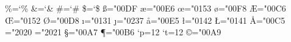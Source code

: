 \outer{}
\outer{}

\def\raggedright{\rightskip\z@ plus2em \spaceskip.3333em \xspaceskip.5em\relax}
\def\ttraggedright{\tt\rightskip\z@ plus2em\relax} %

\chardef\%=`\%
\chardef\&=`\&
\chardef\#=`\#
\chardef\$=`\$
\chardef\ss="00DF
\chardef\ae="00E6
\chardef\oe="0153
\chardef\o="00F8
\chardef\AE="00C6
\chardef\OE="0152
\chardef\O="00D8
\chardef\i="0131 \chardef\j="0237 %
\chardef\aa="00E5
\chardef\l="0142
\chardef\L="0141
\def\leavevmode{\unhbox\voidb@x} %
\def\_{\leavevmode\char"005F\relax} %
\chardef\AA="00C5
\chardef\dag="2020
\chardef\ddag="2021
\chardef\S="00A7
\chardef\P="00B6
\let\Orb=\mdlgwhtcircle
\def\oalign#1{\leavevmode\vtop{\baselineskip\z@skip \lineskip.25ex%
  \ialign{##\crcr#1\crcr}}} \def\o@lign{\lineskiplimit\z@ \oalign}
\def\ooalign{\lineskiplimit-\maxdimen \oalign} %
{\catcode`p=12 \catcode`t=12 \gdef\\#1pt{#1}} \let\getf@ctor=\\
\def\sh@ft#1{\dimen@#1\kern\expandafter\getf@ctor\the\fontdimen1\font
  \dimen@} %
\def\d#1{\smartaccent{#1}{"0323}{"02D3}} %
\def\b#1{\smartaccent{#1}{"0331}{"005F}} %
\def\c#1{\smartaccent{#1}{"0327}{"00B8}} %
\chardef\copyright="00A9
\def\dots{\relax\ifmmode\ldots\else\char"2026\relax\fi}
\def\TeX{T\kern-.1667em\lower.5ex\hbox{E}\kern-.125emX}

\def\smartaccent#1#2#3{%
  \def\temp{#1}%
  \ifx\temp\empty
    \char#3\relax %
  \else
    #1\char#2\relax %
  \fi
}

